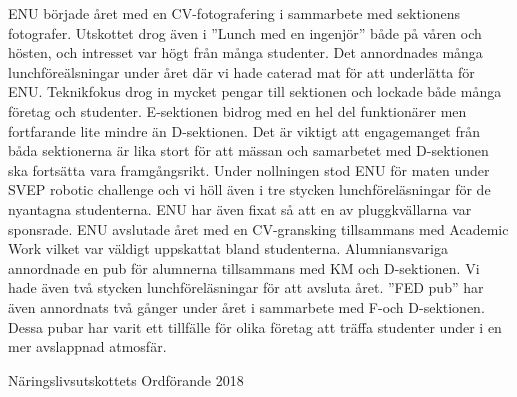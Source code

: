 \documentclass[../_main/handlingar.tex]{subfiles}
\begin{document}

ENU började året med en CV-fotografering i sammarbete med sektionens fotografer. Utskottet drog även i ”Lunch med en ingenjör” både på våren och hösten, och intresset var högt från många studenter.  Det annordnades många lunchföreälsningar under året där vi hade caterad mat för att underlätta för ENU.
Teknikfokus drog in mycket pengar till sektionen och lockade både många företag och studenter. E-sektionen bidrog med en hel del funktionärer men fortfarande lite mindre än D-sektionen. Det är viktigt att engagemanget från båda sektionerna är lika stort för att mässan och samarbetet med D-sektionen ska fortsätta vara framgångsrikt.  
Under nollningen stod ENU för maten under SVEP robotic challenge och vi höll även i tre stycken lunchföreläsningar för de nyantagna studenterna. ENU har även fixat så att en av pluggkvällarna var sponsrade. 
ENU avslutade året med en CV-gransking tillsammans med Academic Work vilket var väldigt uppskattat bland studenterna. Alumniansvariga annordnade en pub för alumnerna tillsammans med KM och D-sektionen. Vi hade även två stycken lunchföreläsningar för att avsluta året.
”FED pub” har även annordnats två gånger under året i sammarbete med F-och D-sektionen. Dessa pubar har varit ett tillfälle för olika företag att träffa studenter under i en mer avslappnad atmosfär.   



\begin{signatures}{1}
    \mvh
    \signature{Isabella Hansen}{Näringslivsutskottets Ordförande 2018}
\end{signatures}
\end{document}
